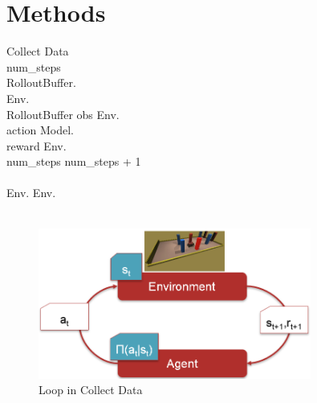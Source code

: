 \chapter{Methods}
\label{cha:Methods}



\renewcommand{\thepseudonum}{\roman{pseudonum}}
\begin{pseudocode}{Collect Data}{ }
\\

num\_steps \\
RolloutBuffer.\\
Env.\\
\WHILE RolloutBuffer \DO
\BEGIN
obs \GETS Env.\\
action \GETS Model.\\
reward \GETS Env.\\
num\_steps \GETS num\_steps + 1\\
\\
\IF Env. \THEN
Env.\\
\END\\
\ENDPROCEDURE

\end{pseudocode}

\begin{figure}
     \centering
     \includegraphics[width=0.8\textwidth]{Bilder/rl_cycle.png}
     \caption{Loop in Collect Data}
     \label{fig:unitycommunication}
\end{figure}


